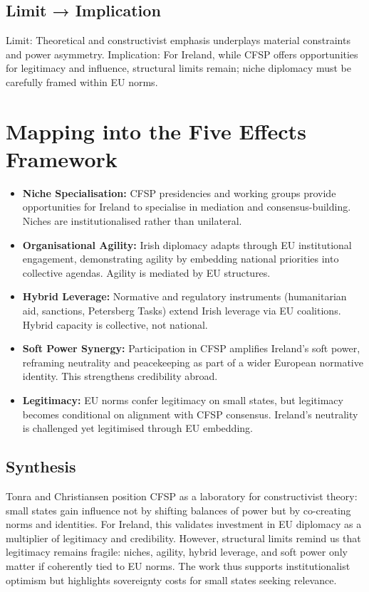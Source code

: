 \subsection*{Limit → Implication}
Limit: Theoretical and constructivist emphasis underplays material constraints and power asymmetry.  
Implication: For Ireland, while CFSP offers opportunities for legitimacy and influence, structural limits remain; niche diplomacy must be carefully framed within EU norms.

\section*{Mapping into the Five Effects Framework}

\begin{itemize}
	\item \textbf{Niche Specialisation:} CFSP presidencies and working groups provide opportunities for Ireland to specialise in mediation and consensus-building. Niches are institutionalised rather than unilateral.
	\item \textbf{Organisational Agility:} Irish diplomacy adapts through EU institutional engagement, demonstrating agility by embedding national priorities into collective agendas. Agility is mediated by EU structures.
	\item \textbf{Hybrid Leverage:} Normative and regulatory instruments (humanitarian aid, sanctions, Petersberg Tasks) extend Irish leverage via EU coalitions. Hybrid capacity is collective, not national.
	\item \textbf{Soft Power Synergy:} Participation in CFSP amplifies Ireland’s soft power, reframing neutrality and peacekeeping as part of a wider European normative identity. This strengthens credibility abroad.
	\item \textbf{Legitimacy:} EU norms confer legitimacy on small states, but legitimacy becomes conditional on alignment with CFSP consensus. Ireland’s neutrality is challenged yet legitimised through EU embedding.
\end{itemize}

\subsection*{Synthesis}
Tonra and Christiansen position CFSP as a laboratory for constructivist theory: small states gain influence not by shifting balances of power but by co-creating norms and identities. For Ireland, this validates investment in EU diplomacy as a multiplier of legitimacy and credibility. However, structural limits remind us that legitimacy remains fragile: niches, agility, hybrid leverage, and soft power only matter if coherently tied to EU norms. The work thus supports institutionalist optimism but highlights sovereignty costs for small states seeking relevance.


